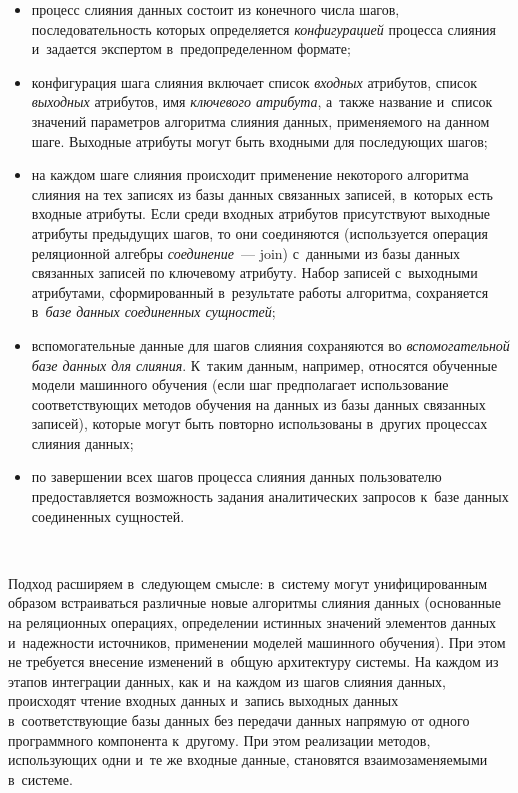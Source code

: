 \begin{multicols}{2}

\noindent
    \begin{itemize}
\item процесс слияния данных состоит из конечного числа шагов, 
последовательность которых определяется \textit{конфигурацией} процесса 
слияния и~задается экспертом в~предопределенном формате;
\item конфигурация шага слияния включает список \textit{входных} 
атрибутов, список \textit{выходных} атрибутов, имя \textit{ключевого 
атрибута}, а~также название и~список значений параметров алгоритма 
слияния данных, применяемого на данном шаге. Выходные атрибуты могут 
быть входными для последующих шагов;
\item на каждом шаге слияния происходит применение некоторого 
алгоритма слияния на тех записях из базы данных связанных записей, 
в~которых есть входные атрибуты. Если среди входных атрибутов 
присутствуют выходные атрибуты предыдущих шагов, то они соединяются 
(используется операция реляционной алгебры \textit{соединение}~--- join) 
с~данными из базы данных связанных записей по ключевому атрибуту. 
Набор записей с~выходными атрибутами, сформированный в~результате 
работы алгоритма, сохраняется в~\textit{базе данных соединенных 
сущностей};
\item вспомогательные данные для шагов слияния сохраняются во 
\textit{вспомогательной базе данных для слияния}. К~таким данным, 
например, относятся обученные модели машинного обучения (если шаг 
предполагает использование соответствующих методов обучения на 
данных из базы данных связанных записей), которые могут быть повторно 
использованы в~других процессах слияния данных;
\item по завершении всех шагов процесса слияния данных пользователю 
предоставляется возможность задания аналитических запросов к~базе 
данных соединенных сущностей.
\end{itemize}

\begin{figure*} %
      \vspace*{1pt}
\begin{center}
   \mbox{%
\epsfxsize=109.051mm 
}
\end{center}
\vspace*{-9pt}
     \end{figure*}
    
    Подход расширяем в~следующем смысле: в~сис\-те\-му могут 
унифицированным образом встраиваться различные новые алгоритмы 
слияния данных (основанные на реляционных операциях, \mbox{определении} 
истинных значений элементов данных и~на\-деж\-ности источников, 
применении моделей машинного обуче\-ния). При этом не требуется внесение 
изменений в~общую архитектуру сис\-те\-мы. На каждом из этапов интеграции 
данных, как и~на каж\-дом из шагов слияния данных, происходят чтение 
входных данных и~запись выходных данных в~со\-от\-вет\-ст\-ву\-ющие базы данных 
без передачи данных напрямую от одного программного компонента 
к~другому. При этом реализации методов, ис\-поль\-зу\-ющих одни и~те же 
входные данные, становятся взаимозаменяемыми в~сис\-теме.


\end{multicols}
